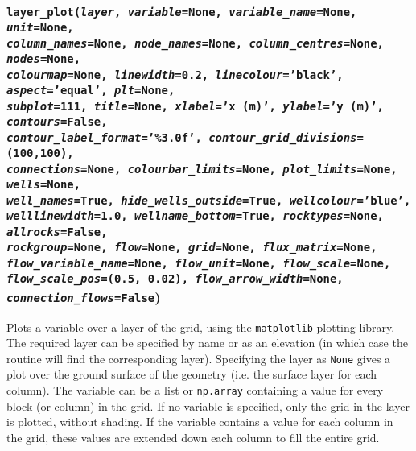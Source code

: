 \begin{snugshade}
\subsubsection{\texttt{layer\_plot(\emph{layer}, \emph{variable}=None, \emph{variable\_name}=None, \emph{unit}=None,\\
    \emph{column\_names}=None, \emph{node\_names}=None, \emph{column\_centres}=None, \emph{nodes}=None,\\
    \emph{colourmap}=None, \emph{linewidth}=0.2, \emph{linecolour}='black', \emph{aspect}='equal', \emph{plt}=None,\\
    \emph{subplot}=111, \emph{title}=None, \emph{xlabel}='x (m)', \emph{ylabel}='y (m)', \emph{contours}=False,\\
    \emph{contour\_label\_format}='\%3.0f', \emph{contour\_grid\_divisions}=(100,100),\\
    \emph{connections}=None, \emph{colourbar\_limits}=None, \emph{plot\_limits}=None, \emph{wells}=None,\\
    \emph{well\_names}=True, \emph{hide\_wells\_outside}=True, \emph{wellcolour}='blue', \\
    \emph{welllinewidth}=1.0, \emph{wellname\_bottom}=True, \emph{rocktypes}=None, \emph{allrocks}=False,\\
    \emph{rockgroup}=None, \emph{flow}=None, \emph{grid}=None, \emph{flux\_matrix}=None,\\
    \emph{flow\_variable\_name}=None, \emph{flow\_unit}=None, \emph{flow\_scale}=None,\\
    \emph{flow\_scale\_pos}=(0.5, 0.02), \emph{flow\_arrow\_width}=None, \emph{connection\_flows}=False})}\end{snugshade}
\label{sec:mulgrid:layer_plot}

Plots a variable over a layer of the grid, using the \texttt{matplotlib} plotting library.  The required layer can be specified by name or as an elevation (in which case the routine will find the corresponding layer).  Specifying the layer as \texttt{None} gives a plot over the ground surface of the geometry (i.e. the surface layer for each column).  The variable can be a list or \texttt{np.array} containing a value for every block (or column) in the grid.  If no variable is specified, only the grid in the layer is plotted, without shading.  If the variable contains a value for each column in the grid, these values are extended down each column to fill the entire grid.


